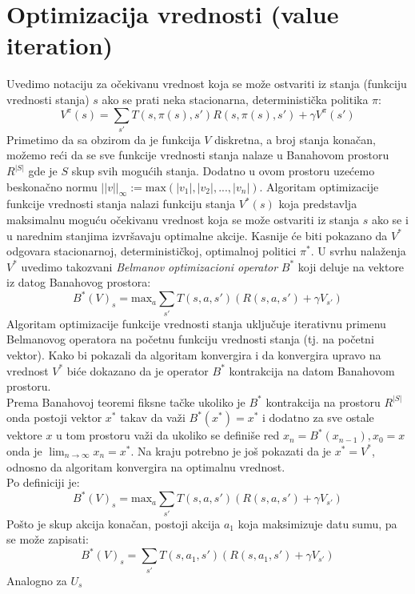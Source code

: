 \documentclass[a4paper,fleqn,12pt]{JMThesis}
\theoremstyle{plain}
\theoremstyle{definition}
\newcommand{\piopt}{{\pi}^{*}}
\theoremstyle{definition}
\begin{document}
\section{Optimizacija vrednosti (value iteration)}
Uvedimo notaciju za očekivanu vrednost koja se može ostvariti iz stanja (funkciju vrednosti stanja) $s$ ako se prati neka stacionarna, deterministička politika $\pi$:
\[
	V^{\pi}(s) = \sum_{s'}T(s,\pi(s),s')R(s,\pi(s),s') + \gamma V^{\pi}(s')
\]
Primetimo da sa obzirom da je funkcija $V$ diskretna, a broj stanja konačan, možemo reći da se sve funkcije vrednosti stanja
nalaze u Banahovom prostoru $R^{|S|}$ gde je $S$ skup svih mogućih stanja. Dodatno u ovom prostoru uzećemo beskonačno normu
$||v||_{\infty} := \text{max}(|v_{1}|,|v_{2}|,...,|v_{n}|)$.
Algoritam optimizacije funkcije vrednosti stanja nalazi funkciju stanja $V^{*}(s)$ koja predstavlja maksimalnu moguću
očekivanu vrednost koja se može ostvariti iz stanja $s$ ako se i u narednim stanjima izvršavaju optimalne akcije.
Kasnije će biti pokazano da $V^{*}$ odgovara stacionarnoj, determinističkoj, optimalnoj politici $\piopt$.
U svrhu nalaženja $V^{*}$ uvedimo takozvani \textit{Belmanov optimizacioni operator} $B^{*}$ koji deluje na vektore
iz datog Banahovog prostora:
\[
	B^{*}(V)_s = \text{max}_{a}\sum_{s'}T(s,a,s')(R(s,a,s') + \gamma V_{s'})
\]
Algoritam optimizacije funkcije vrednosti stanja uključuje iterativnu primenu Belmanovog operatora na 
početnu funkciju vrednosti stanja (tj. na početni vektor). Kako bi pokazali da algoritam konvergira i da konvergira upravo 
na vrednost $V^{*}$ biće dokazano da je operator $B^{*}$ kontrakcija na datom Banahovom prostoru.\\ 
Prema Banahovoj teoremi fiksne tačke ukoliko je $B^{*}$ kontrakcija na prostoru $R^{|S|}$ 
onda postoji vektor $x^*$ takav da važi $B^{*}(x^{*}) = x^{*}$ i dodatno za sve ostale vektore $x$ u tom prostoru 
važi da ukoliko se definiše red $x_n = B^{*}(x_{n-1}), x_0 = x$ onda je $\lim_{n \to \infty} x_n = x^*$. Na kraju potrebno je
još pokazati da je $x^{*} = V^{*}$, odnosno da algoritam konvergira na optimalnu vrednost.
\teo{$B^{*}$ je kontrakcija, tj: $(\forall U \in R^{|S|}, \forall V \in R^{|S|}, U \neq V ) ||B^*(V) - B^*(U)||_{\infty} \leq k ||V - U||_{\infty}$ gde $k \in [0,1)$}\\
Po definiciji je:
\[ B^*(V)_s = \text{max}_{a}\sum_{s'}T(s,a,s')(R(s,a,s')+\gamma V_{s'}) \]
Pošto je skup akcija konačan, postoji akcija $a_1$ koja maksimizuje datu sumu, pa se može zapisati:
\[	B^*(V)_s = \sum_{s'}T(s,a_1,s')(R(s,a_1,s')+\gamma V_{s'}) \]
Analogno za $U_s$
\end{document}
